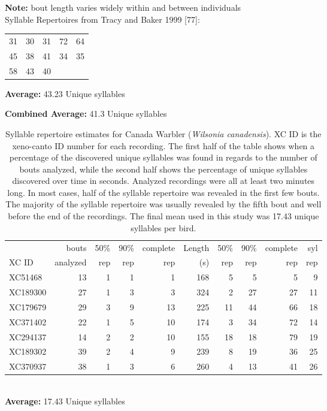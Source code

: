 \documentclass{article}
\begin{document}
  \noindent\textbf{Note:} bout length varies widely within and between individuals
  \\
  
  \noindent Syllable Repertoires from Tracy and Baker 1999 [77]:
  
  \noindent\begin{tabular}{|rrrrr|}
  \hline
  31 & 30 & 31 & 72 & 64\\
  45 & 38 & 41 & 34 & 35\\
  58 & 43 & 40 &  & \\
  \hline
  \end{tabular}
  
  \noindent\textbf{Average:}	43.23 Unique syllables
  
  \noindent\textbf{Combined Average:}	41.3 Unique syllables
  \pagebreak
  
  \begin{table}[H]
  \caption{Syllable repertoire estimates for Canada Warbler (\textit{Wilsonia canadensis}).  XC ID is the xeno-canto ID number for each recording.  The first half of the table shows when a percentage of the discovered unique syllables was found in regards to the number of bouts analyzed, while the second half shows the percentage of unique syllables discovered over time in seconds. Analyzed recordings were all at least two minutes long. In most cases, half of the syllable repertoire was revealed in the first few bouts. The majority of the syllable repertoire was usually revealed by the fifth bout and well before the end of the recordings.  The final mean used in this study was 17.43 unique syllables per bird.}
  
  \begin{tabular}{|l|rrrr|rrrr|r|}
  \hline
  & bouts & 50\% & 90\% & complete & Length & 50\%  & 90\%  & complete  & syl \\
  XC ID & analyzed & rep & rep & rep & (s) & rep  & rep  & rep  & rep \\ 
  \hline
  XC51468 &  13 &   1 &   1 &  1 & 168   &   5 &  5 &  5 &  9 \\ 
  XC189300 &  27 &   1 &  3 &  3 & 324   &  2 &  27 & 27 &  11 \\
  XC179679 &  29 &   3 &   9 &  13 & 225 &   11 & 44 &  66 &  18 \\ 
  XC371402 &  22 &   1 &  5 &  10 & 174  &  3 &   34 & 72 &  14 \\ 
  XC294137 &  14 &   2 &  2 &  10 & 155  &  18 &  18 &  79 &  19 \\ 
  XC189302 &  39 &   2 &   4 &   9 & 239 &   8 &  19 &  36 &  25 \\ 
  XC370937 &  38 &   1 &  3 &  6 & 260   &   4 &  13 &  41 &  26 \\ 
  \hline
  \end{tabular}\\
  \textbf{Average:}	17.43 Unique syllables
  \end{table}
  
\end{document}
